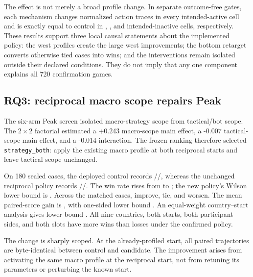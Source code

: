 The effect is not merely a broad profile change. In separate outcome-free
gates, each mechanism changes normalized action traces in every intended-active
cell and is exactly equal to control in \AlliedInactiveCells{},
\SovietInactiveCells{}, and \BottomInactiveCells{} intended-inactive cells,
respectively. These results support three local causal statements about the
implemented policy: the west profiles create the large west improvements; the
bottom retarget converts otherwise tied cases into wins; and the interventions
remain isolated outside their declared conditions. They do not imply that any
one component explains all 720 confirmation games.

\subsection{RQ3: reciprocal macro scope repairs Peak}

The six-arm Peak screen isolated macro-strategy scope from tactical/bot scope.
The $2\times2$ factorial estimated a +0.243 macro-scope main effect, a -0.007
tactical-scope main effect, and a -0.014 interaction. The frozen ranking
therefore selected \texttt{strategy\_both}: apply the existing macro profile at
both reciprocal starts and leave tactical scope unchanged.

On 180 sealed cases, the deployed control records
\PeakControlWins{}/\PeakControlDraws{}/\PeakControlLosses{}, whereas the
unchanged reciprocal policy records
\PeakWins{}/\PeakDraws{}/\PeakLosses{}. The win rate rises from
\PeakControlWinRate{} to \PeakWinRate{}; the new policy's Wilson lower bound is
\PeakWilsonLower{}. Across the matched cases, \PeakImproved{} improve,
\PeakTied{} tie, and \PeakWorsened{} worsen. The mean paired-score gain is
\PeakPairedMean{}, with one-sided lower bound \PeakPairedLower{}. An
equal-weight country--start analysis gives lower bound
\PeakClusterLower{}. All nine countries, both starts, both participant sides,
and both slots have more wins than losses under the confirmed policy.

\begin{table}[t]
\centering
\caption{Peak reciprocal-policy replication by prespecified start, faction
side, and participant slot. Country results are omitted for space; every one
of the nine countries also has more wins than losses.}
\label{tab:peak-strata}
\small

\end{table}

The change is sharply scoped. At the already-profiled start, all
\PeakInvariantPairs{} paired trajectories are byte-identical between control
and candidate. The improvement arises from activating the same macro profile
at the reciprocal start, not from retuning its parameters or perturbing the
known start.

